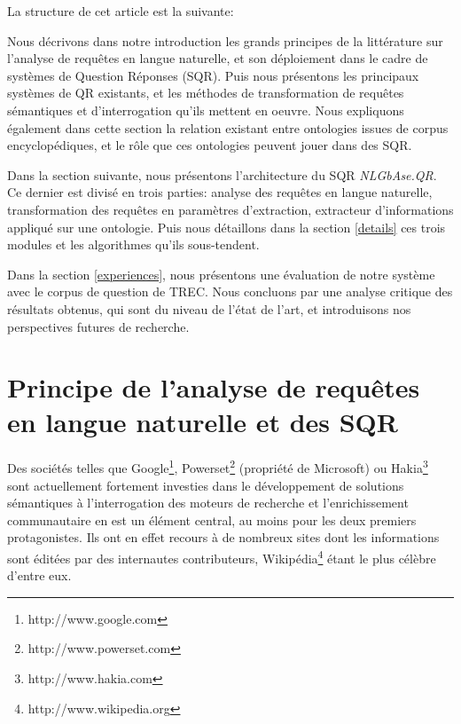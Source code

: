 \documentclass[10pt,a4paper]{article}
\begin{document}
\par La structure de cet article est la suivante: 

\par Nous décrivons dans notre introduction les grands principes de la littérature sur l'analyse de requêtes en langue naturelle, et son déploiement dans le cadre de systèmes de Question Réponses (SQR). Puis nous présentons les principaux systèmes de QR existants, et les méthodes de transformation de requêtes sémantiques et d'interrogation qu'ils mettent en oeuvre. Nous expliquons également dans cette section la relation existant entre ontologies issues de corpus encyclopédiques, et le rôle que ces ontologies peuvent jouer dans des SQR. 
\par Dans la section suivante, nous présentons l'architecture du SQR \textit{NLGbAse.QR}. Ce dernier est divisé en trois parties: analyse des requêtes en langue naturelle, transformation des requêtes en paramètres d'extraction, extracteur d'informations appliqué sur une ontologie. Puis nous détaillons dans la section \ref{details} ces trois modules et les algorithmes qu'ils sous-tendent. 
\par Dans la section \ref{experiences}, nous présentons une évaluation de notre système avec le corpus de question de TREC. Nous concluons par une analyse critique des résultats obtenus, qui sont du niveau de l'état de l'art, et introduisons nos perspectives futures de recherche. 

\section{Principe de l'analyse de requêtes en langue naturelle et des SQR}
\par Des sociétés telles que Google\footnote{http://www.google.com}, Powerset\footnote{http://www.powerset.com} (propriété de Microsoft) ou Hakia\footnote{http://www.hakia.com} sont actuellement fortement investies dans le développement de solutions sémantiques à l'interrogation des moteurs de recherche et l'enrichissement communautaire en est un élément central, au moins pour les deux premiers protagonistes. Ils ont en effet recours à de nombreux sites dont les informations sont éditées par des internautes contributeurs, Wikipédia\footnote{http://www.wikipedia.org} étant le plus célèbre d'entre eux.
\end{document}
